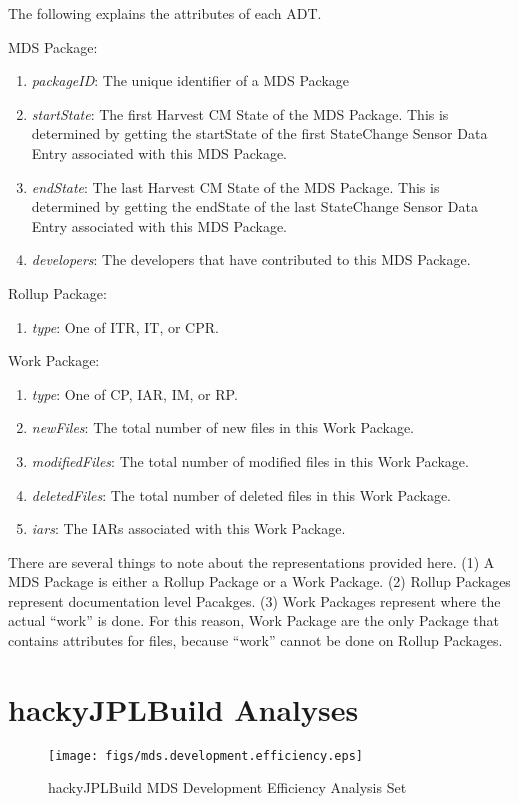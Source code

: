The following explains the attributes of each ADT.
\begin{description}
\item MDS Package:
\begin{enumerate}
\item \emph{packageID}: The unique identifier of a MDS Package
\item \emph{startState}: The first Harvest CM State of the MDS Package.
This is determined by getting the startState of the first StateChange
Sensor Data Entry associated with this MDS Package.
\item \emph{endState}: The last Harvest CM State of the MDS Package.  This
is determined by getting the endState of the last StateChange Sensor Data
Entry associated with this MDS Package.
\item \emph{developers}: The developers that have contributed to this MDS
Package.
\end{enumerate}
\item Rollup Package:
\begin{enumerate}
\item \emph{type}: One of ITR, IT, or CPR.
\end{enumerate}
\item Work Package:
\begin{enumerate}
\item \emph{type}: One of CP, IAR, IM, or RP.
\item \emph{newFiles}: The total number of new files in this Work Package.
\item \emph{modifiedFiles}: The total number of modified files in this Work 
Package.
\item \emph{deletedFiles}: The total number of deleted files in this Work
Package.
\item \emph{iars}: The IARs associated with this Work Package.
\end{enumerate}
\end{description}


There are several things to note about the representations provided
here. (1) A MDS Package is either a Rollup Package or a Work Package.  (2)
Rollup Packages represent documentation level Pacakges.  (3) Work Packages
represent where the actual ``work'' is done.  For this reason, Work Package
are the only Package that contains attributes for files, because ``work''
cannot be done on Rollup Packages.

\section{hackyJPLBuild Analyses}

\begin{figure}[htbp]
  \centering
  \texttt{[image: figs/mds.development.efficiency.eps]}
  \caption{hackyJPLBuild MDS Development Efficiency Analysis Set}
  \label{fig:mds.development.efficiency}
\end{figure}




